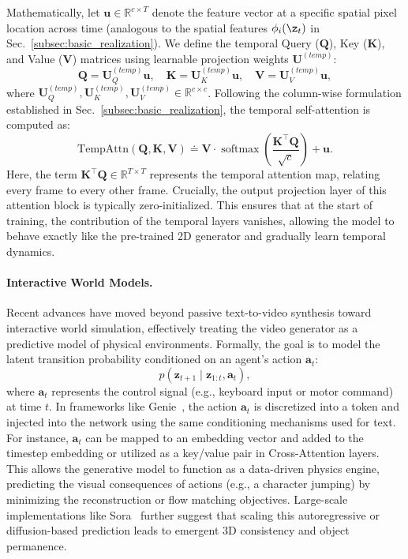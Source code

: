 \documentclass[../../book-main.tex]{subfiles}
\begin{document}
Mathematically, let $\boldsymbol{u} \in \mathbb{R}^{c \times T}$
denote the feature vector at a specific spatial pixel location across
time (analogous to the spatial features $\phi_i(\z_t)$ in
Sec.~\ref{subsec:basic_realization}). We define the temporal Query
($\boldsymbol{Q}$), Key ($\boldsymbol{K}$), and Value
($\boldsymbol{V}$) matrices using learnable projection weights
$\boldsymbol{U}^{(temp)}$:
\begin{equation}
\boldsymbol{Q} = \boldsymbol{U}^{(temp)}_Q \boldsymbol{u}, \quad
\boldsymbol{K} = \boldsymbol{U}^{(temp)}_K \boldsymbol{u}, \quad
\boldsymbol{V} = \boldsymbol{U}^{(temp)}_V \boldsymbol{u},
\end{equation}
where $\boldsymbol{U}^{(temp)}_{Q}, \boldsymbol{U}^{(temp)}_{K},
\boldsymbol{U}^{(temp)}_{V} \in \mathbb{R}^{c \times c}$. Following
the column-wise formulation established in
Sec.~\ref{subsec:basic_realization}, the temporal self-attention is computed as:
\begin{equation}
\text{TempAttn}(\boldsymbol{Q}, \boldsymbol{K}, \boldsymbol{V})
\doteq \boldsymbol{V} \cdot \operatorname{softmax}\left(
\frac{\boldsymbol{K}^\top \boldsymbol{Q}}{\sqrt{c}} \right) + \boldsymbol{u}.
\end{equation}
Here, the term $\boldsymbol{K}^\top \boldsymbol{Q} \in \mathbb{R}^{T
\times T}$ represents the temporal attention map, relating every
frame to every other frame. Crucially, the output projection layer of
this attention block is typically zero-initialized. This ensures that
at the start of training, the contribution of the temporal layers
vanishes, allowing the model to behave exactly like the pre-trained
2D generator and gradually learn temporal dynamics.

\paragraph{Interactive World Models.}
Recent advances have moved beyond passive text-to-video synthesis
toward interactive world simulation, effectively treating the video
generator as a predictive model of physical environments. Formally,
the goal is to model the latent transition probability conditioned on
an agent's action $\boldsymbol{a}_t$:
\begin{equation}
p(\boldsymbol{z}_{t+1} \mid \boldsymbol{z}_{1:t}, \boldsymbol{a}_t),
\end{equation}
where $\boldsymbol{a}_t$ represents the control signal (e.g.,
keyboard input or motor command) at time $t$. In frameworks like
Genie~\citep{bruce2024genie}, the action $\boldsymbol{a}_t$ is
discretized into a token and injected into the network using the same
conditioning mechanisms used for text. For instance,
$\boldsymbol{a}_t$ can be mapped to an embedding vector and added to
the timestep embedding or utilized as a key/value pair in
Cross-Attention layers. This allows the generative model to function
as a data-driven physics engine, predicting the visual consequences
of actions (e.g., a character jumping) by minimizing the
reconstruction or flow matching objectives. Large-scale
implementations like Sora~\citep{openai2024sora} further suggest that
scaling this autoregressive or diffusion-based prediction leads to
emergent 3D consistency and object permanence.
\end{document}
